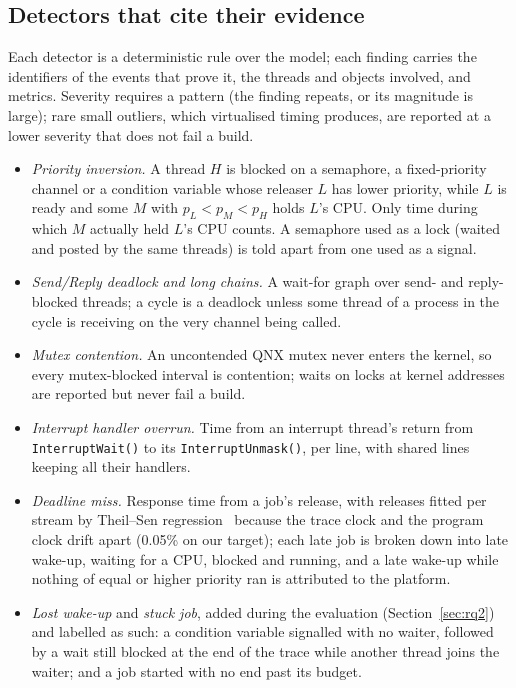 \documentclass[sigconf,review]{acmart}
\newcommand{\qnx}[1]{\texttt{#1}}
\begin{document}
\subsection{Detectors that cite their evidence}

Each detector is a deterministic rule over the model; each finding carries the identifiers of the events that prove it,
the threads and objects involved, and metrics. Severity requires a pattern (the finding repeats, or its magnitude is
large); rare small outliers, which virtualised timing produces, are reported at a lower severity that does not fail a build.

\begin{itemize}
\item \emph{Priority inversion.} A thread $H$ is blocked on a semaphore, a fixed-priority channel or a condition variable whose
  releaser $L$ has lower priority, while $L$ is ready and some $M$ with $p_L < p_M < p_H$ holds $L$'s CPU. Only time during which
  $M$ actually held $L$'s CPU counts. A semaphore used as a lock (waited and posted by the same threads) is told apart from one
  used as a signal.
\item \emph{Send/Reply deadlock and long chains.} A wait-for graph over send- and reply-blocked threads; a cycle is a deadlock unless
  some thread of a process in the cycle is receiving on the very channel being called.
\item \emph{Mutex contention.} An uncontended QNX mutex never enters the kernel, so every mutex-blocked interval is contention; waits
  on locks at kernel addresses are reported but never fail a build.
\item \emph{Interrupt handler overrun.} Time from an interrupt thread's return from \qnx{InterruptWait()} to its
  \qnx{InterruptUnmask()}, per line, with shared lines keeping all their handlers.
\item \emph{Deadline miss.} Response time from a job's release, with releases fitted per stream by Theil--Sen
  regression~\cite{sen1968} because the trace clock and the program clock drift apart (0.05\% on our target); each late job is
  broken down into late wake-up, waiting for a CPU, blocked and running, and a late wake-up while nothing of equal or higher
  priority ran is attributed to the platform.
\item \emph{Lost wake-up} and \emph{stuck job}, added during the evaluation (Section~\ref{sec:rq2}) and labelled as such: a
  condition variable signalled with no waiter, followed by a wait still blocked at the end of the trace while another thread joins
  the waiter; and a job started with no end past its budget.
\end{itemize}
\end{document}
